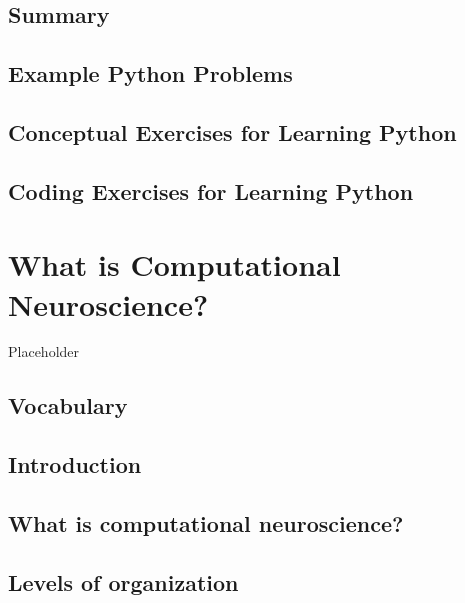 \documentclass[
]{book}
\begin{document}
\hypertarget{summary}{%
\section{Summary}\label{summary}}

\hypertarget{example-python-problems}{%
\section{Example Python Problems}\label{example-python-problems}}

\hypertarget{conceptual-exercises-for-learning-python}{%
\section{Conceptual Exercises for Learning Python}\label{conceptual-exercises-for-learning-python}}

\hypertarget{coding-exercises-for-learning-python}{%
\section{Coding Exercises for Learning Python}\label{coding-exercises-for-learning-python}}

\hypertarget{Ch2}{%
\chapter{What is Computational Neuroscience?}\label{Ch2}}

Placeholder

\hypertarget{vocabulary}{%
\section{Vocabulary}\label{vocabulary}}

\hypertarget{introduction}{%
\section{Introduction}\label{introduction}}

\hypertarget{what-is-computational-neuroscience}{%
\section{What is computational neuroscience?}\label{what-is-computational-neuroscience}}

\hypertarget{levels-of-organization}{%
\section{Levels of organization}\label{levels-of-organization}}
\end{document}
